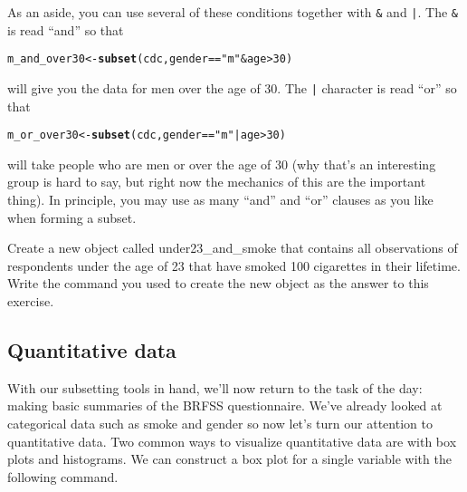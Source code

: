 \documentclass{article}\usepackage[]{graphicx}\usepackage[]{color}
\makeatletter
\newcommand{\hlnum}[1]{\textcolor[rgb]{0.686,0.059,0.569}{#1}}%
\newcommand{\hlstr}[1]{\textcolor[rgb]{0.192,0.494,0.8}{#1}}%
\newcommand{\hlopt}[1]{\textcolor[rgb]{0,0,0}{#1}}%
\newcommand{\hlstd}[1]{\textcolor[rgb]{0.345,0.345,0.345}{#1}}%
\newcommand{\hlkwb}[1]{\textcolor[rgb]{0.69,0.353,0.396}{#1}}%
\newcommand{\hlkwd}[1]{\textcolor[rgb]{0.737,0.353,0.396}{\textbf{#1}}}%
\newenvironment{kframe}{%
 \def\at@end@of@kframe{}%
 \ifinner\ifhmode%
  \def\at@end@of@kframe{\end{minipage}}%
  \begin{minipage}{\columnwidth}%
 \fi\fi%
 \def\FrameCommand##1{\hskip\@totalleftmargin \hskip-\fboxsep
 \colorbox{shadecolor}{##1}\hskip-\fboxsep
     \hskip-\linewidth \hskip-\@totalleftmargin \hskip\columnwidth}%
 \MakeFramed {\advance\hsize-\width
   \@totalleftmargin\z@ \linewidth\hsize
   \@setminipage}}%
 {\par\unskip\endMakeFramed%
 \at@end@of@kframe}
\newenvironment{knitrout}{}{} %
\makeatother
\begin{document}
As an aside, you can use several of these conditions together with \texttt{\&} and \texttt{|}. The \texttt{\&} is read ``and'' so that

\begin{knitrout}
\color{fgcolor}\begin{kframe}
\begin{alltt}
\hlstd{m_and_over30} \hlkwb{<-} \hlkwd{subset}\hlstd{(cdc, gender} \hlopt{==} \hlstr{"m"} \hlopt{&} \hlstd{age} \hlopt{>} \hlnum{30}\hlstd{)}
\end{alltt}
\end{kframe}
\end{knitrout}

will give you the data for men over the age of 30. The \texttt{|} character is read ``or'' so that

\begin{knitrout}
\color{fgcolor}\begin{kframe}
\begin{alltt}
\hlstd{m_or_over30} \hlkwb{<-} \hlkwd{subset}\hlstd{(cdc, gender} \hlopt{==} \hlstr{"m"} \hlopt{|} \hlstd{age} \hlopt{>} \hlnum{30}\hlstd{)}
\end{alltt}
\end{kframe}
\end{knitrout}

will take people who are men or over the age of 30 (why that's an interesting group is hard to say, but right now the mechanics of this are the important thing). In principle, you may use as many ``and'' and ``or'' clauses as you like when forming a subset.

\begin{exercise}
Create a new object called \hlstd{under23\_and\_smoke} that contains all observations of respondents under the age of 23 that have smoked 100 cigarettes in their lifetime. Write the command you used to create the new object as the answer to this exercise.
\end{exercise}

\subsection*{Quantitative data}

With our subsetting tools in hand, we'll now return to the task of the day: making basic summaries of the BRFSS questionnaire.  We've already looked at categorical data such as \hlstd{smoke} and \hlstd{gender} so now let's turn our attention to quantitative data.  Two common ways to visualize quantitative data are with box plots and histograms.  We can construct a box plot for a single variable with the following command.
\end{document}
